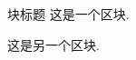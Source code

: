 \documentclass[nofonts]{beamer}
\begin{document}
\begin{frame}
	\begin{block}{块标题}
		这是一个区块.
	\end{block}
	\begin{block}{}
		这是另一个区块.
	\end{block}
\end{frame}
\end{document}
